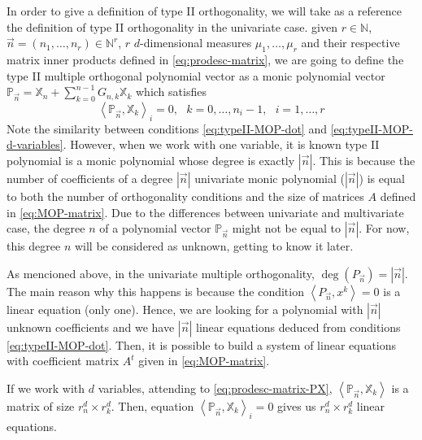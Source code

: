\documentclass[12pt,a4]{report}
\theoremstyle{plain}
\newcommand{\N}[0]{\mathbb{N}}
\newcommand{\prodesc}[2]{\left\langle #1 , #2 \right\rangle}
\begin{document}
In order to give a definition of type II orthogonality, we will take as a reference the definition of type II orthogonality in the univariate case. given $r\in\N$, $\vec n = (n_1,\dots, n_r)\in\N^r$, $r$ $d$-dimensional measures $\mu_1, \dots, \mu_r$ and their respective matrix inner products defined in \eqref{eq:prodesc-matrix}, we are going to define the type II multiple orthogonal polynomial vector as a monic polynomial vector $\mathbb P_{\vec n} = \mathbb X_n + \displaystyle\sum_{k=0}^{n-1}G_{n,k} \mathbb X_k$ which satisfies
\begin{equation}
    \label{eq:typeII-MOP-d-variables}
    \prodesc{\mathbb P_{\vec n}}{\mathbb X_k}_i = 0, \ \ \ k=0,\dots,n_i-1, \ \ \ i=1,\dots,r
\end{equation}
Note the similarity between conditions \eqref{eq:typeII-MOP-dot} and \eqref{eq:typeII-MOP-d-variables}. However, when we work with one variable, it is known type II polynomial is a monic polynomial whose degree is exactly $|\vec n|$. This is because the number of coefficients of a degree $|\vec n|$ univariate monic polynomial ($|\vec n|$) is equal to both the number of orthogonality conditions and the size of matrices $A$ defined in \eqref{eq:MOP-matrix}. Due to the differences between univariate and multivariate case, the degree $n$ of a polynomial vector $\mathbb P_{\vec n}$ might not be equal to $|\vec n|$. For now, this degree $n$ will be considered as unknown, getting to know it later.

As mencioned above, in the univariate multiple orthogonality, $\deg(P_{\vec n})=|\vec n|$. The main reason why this happens is because the condition $\prodesc{P_{\vec n}}{x^k}=0$ is a linear equation (only one). Hence, we are looking for a polynomial with $|\vec n|$ unknown coefficients and we have $|\vec n|$ linear equations deduced from conditions \eqref{eq:typeII-MOP-dot}. Then, it is possible to build a system of linear equations with coefficient matrix $A^t$ given in \eqref{eq:MOP-matrix}.

If we work with $d$ variables, attending to \eqref{eq:prodesc-matrix-PX}, $\prodesc{\mathbb P_{\vec n}}{\mathbb X_k}$ is a matrix of size $r_n^d\times r_k^d$. Then, equation $\prodesc{\mathbb P_{\vec n}}{\mathbb X_k}_i = 0$ gives us $r_n^d\times r_k^d$ linear equations.
\end{document}
